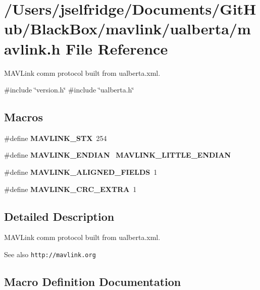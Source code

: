\section{/\+Users/jselfridge/\+Documents/\+Git\+Hub/\+Black\+Box/mavlink/ualberta/mavlink.h File Reference}
\label{ualberta_2mavlink_8h}


M\+A\+V\+Link comm protocol built from ualberta.\+xml.  


{\ttfamily \#include \char`\"{}version.\+h\char`\"{}}\newline
{\ttfamily \#include \char`\"{}ualberta.\+h\char`\"{}}\newline
\subsection*{Macros}
\begin{DoxyCompactItemize}
\item 
\#define \textbf{ M\+A\+V\+L\+I\+N\+K\+\_\+\+S\+TX}~254
\item 
\#define \textbf{ M\+A\+V\+L\+I\+N\+K\+\_\+\+E\+N\+D\+I\+AN}~\textbf{ M\+A\+V\+L\+I\+N\+K\+\_\+\+L\+I\+T\+T\+L\+E\+\_\+\+E\+N\+D\+I\+AN}
\item 
\#define \textbf{ M\+A\+V\+L\+I\+N\+K\+\_\+\+A\+L\+I\+G\+N\+E\+D\+\_\+\+F\+I\+E\+L\+DS}~1
\item 
\#define \textbf{ M\+A\+V\+L\+I\+N\+K\+\_\+\+C\+R\+C\+\_\+\+E\+X\+T\+RA}~1
\end{DoxyCompactItemize}


\subsection{Detailed Description}
M\+A\+V\+Link comm protocol built from ualberta.\+xml. 

\begin{DoxySeeAlso}{See also}
{\tt http\+://mavlink.\+org} 
\end{DoxySeeAlso}


\subsection{Macro Definition Documentation}
\mbox{\label{ualberta_2mavlink_8h_a66ac6e7995651b5a5cb317194c1f46e0}} 
